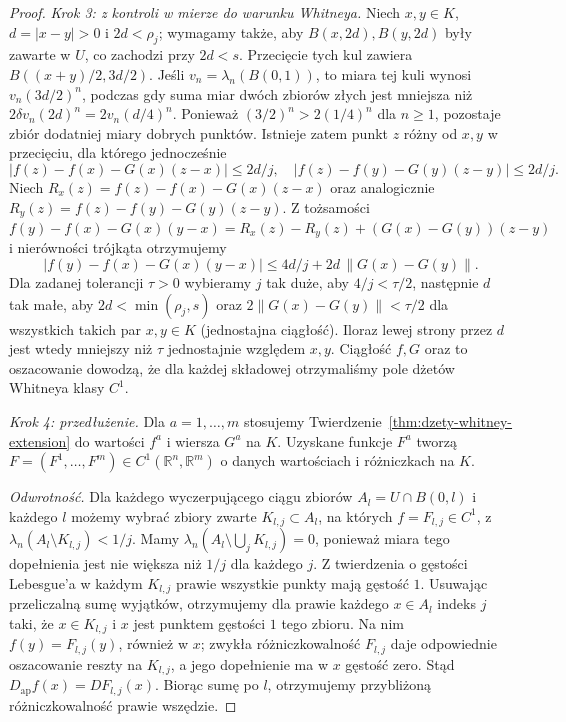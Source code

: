 \begin{proof}
\emph{Krok 3: z kontroli w mierze do warunku Whitneya.}
Niech $x,y\in K$, $d=|x-y|>0$ i
$2d<\rho_j$; wymagamy także, aby $B(x,2d),B(y,2d)$
były zawarte w $U$, co zachodzi przy $2d<s$.
Przecięcie tych kul zawiera $B((x+y)/2,3d/2)$.
Jeśli $v_n=\lambda_n(B(0,1))$, to miara tej kuli
wynosi $v_n(3d/2)^n$, podczas gdy suma miar
dwóch zbiorów złych jest mniejsza niż
$2\delta v_n(2d)^n=2v_n(d/4)^n$.
Ponieważ $(3/2)^n>2(1/4)^n$ dla $n\ge1$,
pozostaje zbiór dodatniej miary dobrych punktów.
Istnieje zatem punkt $z$ różny od $x,y$
w przecięciu, dla którego jednocześnie
\[
 |f(z)-f(x)-G(x)(z-x)|\le 2d/j,
 \quad |f(z)-f(y)-G(y)(z-y)|\le 2d/j.
\]
Niech $R_x(z)=f(z)-f(x)-G(x)(z-x)$
oraz analogicznie $R_y(z)=f(z)-f(y)-G(y)(z-y)$.
Z tożsamości
$f(y)-f(x)-G(x)(y-x)=R_x(z)-R_y(z)
 +(G(x)-G(y))(z-y)$
i nierówności trójkąta otrzymujemy
\[
 |f(y)-f(x)-G(x)(y-x)|
 \le4d/j+2d\,\|G(x)-G(y)\|.
\]
Dla zadanej tolerancji $\tau>0$ wybieramy
$j$ tak duże, aby $4/j<\tau/2$, następnie
$d$ tak małe, aby $2d<\min(\rho_j,s)$ oraz
$2\|G(x)-G(y)\|<\tau/2$ dla wszystkich takich par
$x,y\in K$ (jednostajna ciągłość).
Iloraz lewej strony przez $d$ jest wtedy mniejszy
niż $\tau$ jednostajnie względem $x,y$.
Ciągłość $f,G$ oraz to oszacowanie dowodzą,
że dla każdej składowej otrzymaliśmy pole
dżetów Whitneya klasy $C^1$.

\emph{Krok 4: przedłużenie.}
Dla $a=1,\ldots,m$ stosujemy
Twierdzenie~\ref{thm:dzety-whitney-extension}
do wartości $f^a$ i wiersza $G^a$ na $K$.
Uzyskane funkcje $F^a$ tworzą
$F=(F^1,\ldots,F^m)\in C^1(\mathbb R^n,\mathbb R^m)$
o danych wartościach i różniczkach na $K$.

\emph{Odwrotność.}
Dla każdego wyczerpującego ciągu zbiorów
$A_l=U\cap B(0,l)$ i każdego $l$ możemy wybrać
zbiory zwarte $K_{l,j}\subset A_l$, na których
$f=F_{l,j}\in C^1$, z
$\lambda_n(A_l\setminus K_{l,j})<1/j$.
Mamy $\lambda_n(A_l\setminus\bigcup_j K_{l,j})=0$,
ponieważ miara tego dopełnienia jest nie większa
niż $1/j$ dla każdego $j$. Z twierdzenia o gęstości
Lebesgue'a w każdym $K_{l,j}$ prawie wszystkie
punkty mają gęstość $1$. Usuwając przeliczalną
sumę wyjątków, otrzymujemy dla prawie każdego
$x\in A_l$ indeks $j$ taki, że $x\in K_{l,j}$
i $x$ jest punktem gęstości $1$ tego zbioru.
Na nim $f(y)=F_{l,j}(y)$, również w $x$;
zwykła różniczkowalność $F_{l,j}$ daje odpowiednie
oszacowanie reszty na $K_{l,j}$, a jego dopełnienie
ma w $x$ gęstość zero. Stąd
$D_{\mathrm{ap}}f(x)=DF_{l,j}(x)$. Biorąc sumę po $l$,
otrzymujemy przybliżoną różniczkowalność prawie wszędzie.
\end{proof}


